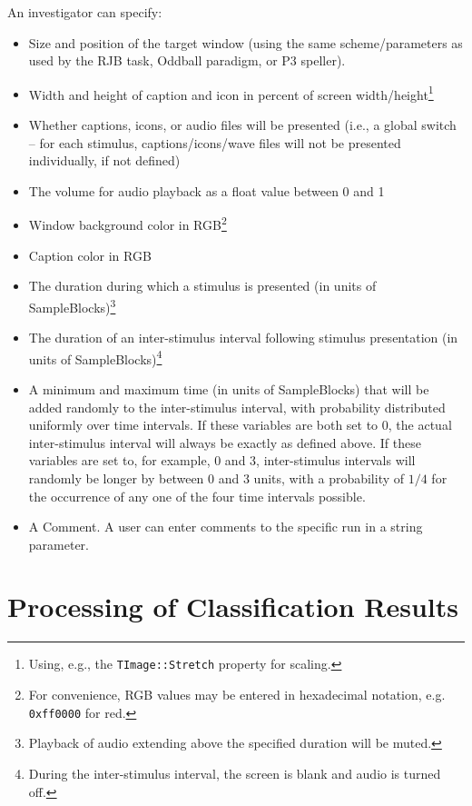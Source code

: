 \documentclass[letterpaper,oneside,12pt]{article}
\begin{document}
An investigator can specify:
\begin{itemize}
 \item Size and position of the target window (using the same scheme/parameters 
       as used by the RJB task, Oddball paradigm, or P3 speller).
 \item Width and height of caption and icon in percent of screen
       width/height\footnote{Using, e.g., the \texttt{TImage::Stretch} property for scaling.}
 \item Whether captions, icons, or audio files will be presented
       (i.e., a global switch -- for each stimulus, captions/icons/wave files
       will not be presented individually, if not defined)
 \item The volume for audio playback as a float value between 0 and 1
 \item Window background color in RGB\footnote{For convenience, RGB values
       may be entered in hexadecimal notation, e.g. \texttt{0xff0000} for red.}
 \item Caption color in RGB
 \item The duration during which a stimulus is presented (in units of
       SampleBlocks)\footnote{Playback of audio extending above the specified duration 
       will be muted.}
 \item The duration of an inter-stimulus interval following stimulus presentation
       (in units of SampleBlocks)\footnote{During the inter-stimulus interval, the
       screen is blank and audio is turned off.}
 \item A minimum and maximum time (in units of SampleBlocks) that will be added randomly
       to the inter-stimulus interval, with probability distributed uniformly over time
       intervals.
       If these variables are both set to 0, the actual inter-stimulus interval will
       always be exactly as defined above.
       If these variables are set to, for example, 0 and 3, inter-stimulus intervals
       will randomly be longer by between 0 and 3 units, with a probability of $1/4$
       for the occurrence of any one of the four time intervals possible.
 \item A Comment. A user can enter comments to the specific run in a string parameter.
\end{itemize}


\section{Processing of Classification Results}
\end{document}
